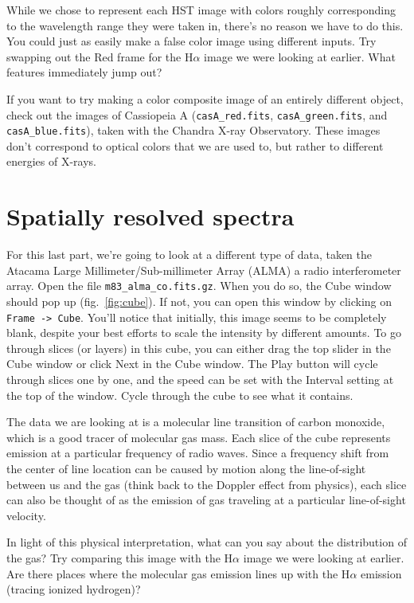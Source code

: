 \documentclass[12pt]{article}
\begin{document}
While we chose to represent each HST image with colors roughly corresponding to the wavelength range they were taken in, there's no reason we have to do this.  You could just as easily make a false color image using different inputs.  Try swapping out the Red frame for the H$\alpha$ image we were looking at earlier.  What features immediately jump out?

If you want to try making a color composite image of an entirely different object, check out the images of Cassiopeia A (\texttt{casA\_red.fits}, \texttt{casA\_green.fits}, and \texttt{casA\_blue.fits}), taken with the Chandra X-ray Observatory.  These images don't correspond to optical colors that we are used to, but rather to different energies of X-rays.

\section{Spatially resolved spectra}
\label{sec:spec}

For this last part, we're going to look at a different type of data, taken the Atacama Large Millimeter/Sub-millimeter Array (ALMA) a radio interferometer array.  Open the file \texttt{m83\_alma\_co.fits.gz}.  When you do so, the Cube window should pop up (fig.~\ref{fig:cube}).  If not, you can open this window by clicking on \texttt{Frame -> Cube}.  You'll notice that initially, this image seems to be completely blank, despite your best efforts to scale the intensity by different amounts.  To go through slices (or layers) in this cube, you can either drag the top slider in the Cube window or click Next in the Cube window.  The Play button will cycle through slices one by one, and the speed can be set with the Interval setting at the top of the window.  Cycle through the cube to see what it contains.

The data we are looking at is a molecular line transition of carbon monoxide, which is a good tracer of molecular gas mass. Each slice of the cube represents emission at a particular frequency of radio waves.  Since a frequency shift from the center of line location can be caused by motion along the line-of-sight between us and the gas (think back to the Doppler effect from physics), each slice can also be thought of as the emission of gas traveling at a particular line-of-sight velocity.

In light of this physical interpretation, what can you say about the distribution of the gas?  Try comparing this image with the H$\alpha$ image we were looking at earlier.  Are there places where the molecular gas emission lines up with the H$\alpha$ emission (tracing ionized hydrogen)?
\end{document}
